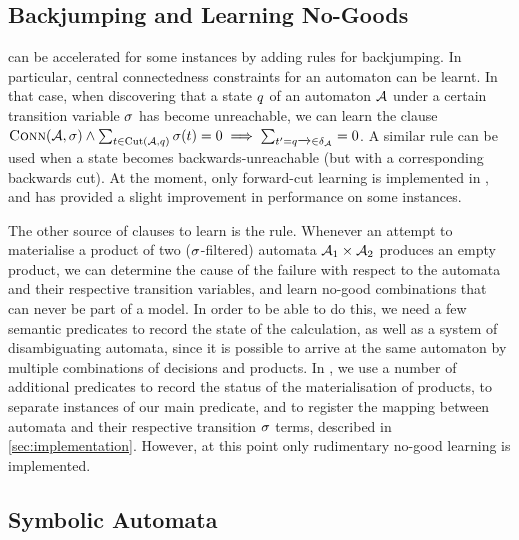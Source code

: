 \documentclass[acmsmall,review,anonymous,screen]{acmart}\settopmatter{printfolios=true,printccs=false,printacmref=true}
\theoremstyle{definition}
\begin{document}
\subsection{Backjumping and Learning No-Goods}\label{sec:ext:backjumping}

\Calculus{} can be accelerated for some instances by adding rules for
backjumping. In particular, central connectedness constraints for an automaton
can be learnt. In that case, when discovering that a state $q$ of an
automaton $\mathcal{A}$ under a certain transition variable $\operatorname{\sigma}$ has become
unreachable, we can learn the clause $\operatorname{\textsc{Conn}}(\mathcal{A}, \operatorname{\sigma}) \land
\sum_{t \in \operatorname{Cut}(\mathcal{A}, q)} \operatorname{\sigma}(t) =
0 \implies \sum_{t' = q \xrightarrow{} \in
\delta_{\mathcal{A}}} = 0$. A similar rule can be used when a state becomes
backwards-unreachable (but with a corresponding backwards cut). At the moment,
only forward-cut learning is implemented in \Catra, and has provided a slight
improvement in performance on some instances.

The other source of clauses to learn is the \Materialise{} rule. Whenever an
attempt to materialise a product of two ($\operatorname{\sigma}$-filtered) automata
$\mathcal{A}_1 \times \mathcal{A}_2$ produces an empty product, we can determine
the cause of the failure with respect to the automata and their respective
transition variables, and learn no-good combinations that can never be part of a
model. In order to be able to do this, we need a few semantic predicates to
record the state of the calculation, as well as a system of disambiguating
automata, since it is possible to arrive at the same automaton by multiple
combinations of decisions and products. In \Catra{}, we use a number of
additional predicates to record the status of the materialisation of products,
to separate instances of our main predicate, and to register the mapping between
automata and their respective transition $\operatorname{\sigma}$ terms, described in
\cref{sec:implementation}. However, at this point only rudimentary no-good
learning is implemented.

\subsection{Symbolic Automata}\label{sec:ext:symbolic}
\end{document}
